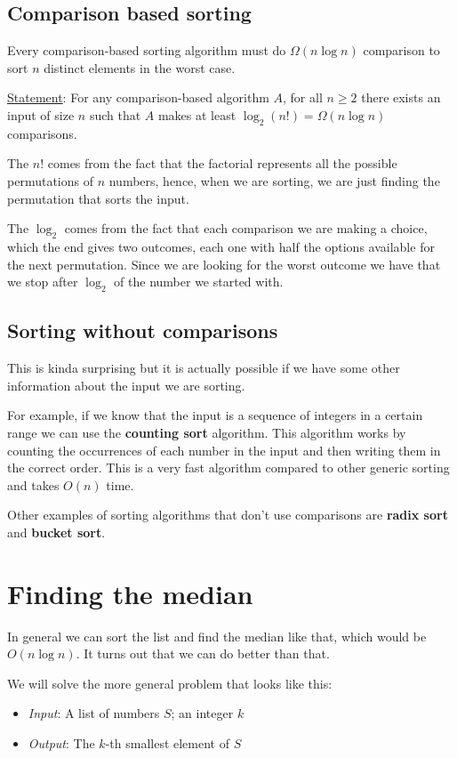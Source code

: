 \documentclass[12pt]{extarticle}
\begin{document}
\subsection{Comparison based sorting}

Every comparison-based sorting algorithm
must do $\Omega(n \log n)$ comparison to sort $n$ distinct elements in the worst case.

\underline{Statement}: For any comparison-based algorithm $A$, for all $n \ge 2$ there exists an input of size $n$
such that $A$ makes at least $\log_2(n!) = \Omega(n \log n)$ comparisons.

The $n!$ comes from the fact that the factorial represents all the possible permutations of $n$ numbers,
hence, when we are sorting, we are just finding the  permutation that sorts the input.

The $\log_2$ comes from the fact that each comparison we are making a choice, which the end gives two outcomes,
each one with half the options available for the next permutation.
Since we are looking for the worst outcome we have that we stop after $\log_2$ of the number we started with.

\subsection{Sorting without comparisons}

This is kinda surprising but it is actually possible if we have some other information about the input we are sorting.

For example, if we know that the input is a sequence of integers in a certain range we can use the \textbf{counting sort} algorithm.
This algorithm works by counting the occurrences of each number in the input and then writing them in the correct order.
This is a very fast algorithm compared to other generic sorting and takes $O(n)$ time.

Other examples of sorting algorithms that don't use comparisons are \textbf{radix sort} and \textbf{bucket sort}.

\section{Finding the median}

In general we can sort the list and find the median like that, which would be $O(n \log n)$.
It turns out that we can do better than that.

We will solve the more general problem that looks like this:
\begin{itemize}
    \item \textit{Input}: A list of numbers $S$; an integer $k$
    \item \textit{Output}: The $k$-th smallest element of $S$
\end{itemize}
\end{document}
